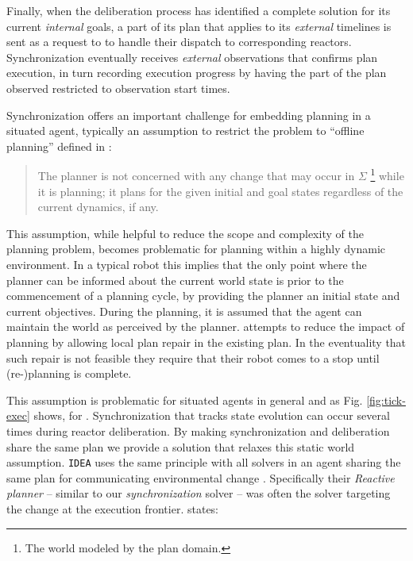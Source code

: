 Finally, when the deliberation process has identified a complete
solution for its current {\em internal} goals, a part of its plan that
applies to its {\em external} timelines is sent as a request to \rx to
handle their dispatch to corresponding reactors.  Synchronization
eventually receives {\em external } observations that confirms plan
execution, in turn recording execution progress by having the part of
the plan observed restricted to observation start times.

Synchronization offers an important challenge for embedding planning
in a situated agent, typically an assumption to restrict the problem
to ``offline planning'' defined in \cite{ghallab04}:

{\scriptsize
  \begin{quote}
    The planner is not concerned with any change that may occur in
    $\Sigma$ \footnote{The world modeled by the plan domain.} while it
    is planning; it plans for the given initial and goal states
    regardless of the current dynamics, if any.
\end{quote}}

This assumption, while helpful to reduce the scope and complexity of
the planning problem, becomes problematic for planning within a highly
dynamic environment. In a typical robot this implies that the only
point where the planner can be informed about the current world state
is prior to the commencement of a planning cycle, by providing the
planner an initial state and current objectives. During the planning,
it is assumed that the agent can maintain the world as perceived by
the planner. \cite{lemai04, lemai-chenevier2004} attempts to reduce
the impact of planning by allowing local plan repair in the existing
plan. In the eventuality that such repair is not feasible they require
that their robot comes to a stop until (re-)planning is complete.  

This assumption is problematic for situated agents in general and as
Fig. \ref{fig:tick-exec} shows, for \rx. Synchronization that tracks
state evolution can occur several times during reactor
deliberation. By making synchronization and deliberation share the
same plan we provide a solution that relaxes this static world
assumption. \texttt{IDEA} uses the same principle with all solvers in
an agent sharing the same plan for communicating environmental change
\cite{Dias:2003ua, mus06}. Specifically their {\em Reactive planner}
-- similar to our {\em synchronization} solver -- was often the solver
targeting the change at the execution frontier. 
\cite{Dias:2003ua} states:

